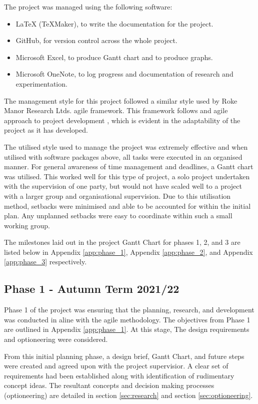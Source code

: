 \documentclass [11pt]{article}
\begin{document}
The project was managed using the following software: 

\begin{itemize}

\item{LaTeX (TeXMaker), to write the documentation for the project.}
\item{GitHub, for version control across the whole project.}
\item{Microsoft Excel, to produce Gantt chart and to produce graphs.}
\item{Microsoft OneNote, to log progress and documentation of research and experimentation.}

\end{itemize}

The management style for this project followed a similar style used by Roke Manor Research Ltds. agile framework. This framework follows and agile approach to project development \cite{agile_development}, which is evident in the adaptability of the project as it has developed. 

The utilised style used to manage the project was extremely effective and when utilised with software packages above, all tasks were executed in an organised manner. For general awareness of time management and deadlines, a Gantt chart was utilised. This worked well for this type of project, a solo project undertaken with the supervision of one party, but would not have scaled well to a project with a larger group and organisational supervision. Due to this utilisation method, setbacks were minimised and able to be accounted for within the initial plan. Any unplanned setbacks were easy to coordinate within such a small working group. 

The milestones laid out in the project Gantt Chart for phases 1, 2, and 3 are listed below in Appendix \ref{app:phase_1}, Appendix \ref{app:phase_2}, and Appendix \ref{app:phase_3} respectively.

\subsection{Phase 1 - Autumn Term 2021/22}

Phase 1 of the project was ensuring that the planning, research, and development was conducted in aline with the agile methodology. The objectives from Phase 1 are outlined in Appendix \ref{app:phase_1}. At this stage, The design requirements and optioneering were considered.  

From this initial planning phase, a design brief, Gantt Chart, and future steps were created and agreed upon with the project supervisior. A clear set of requirements had been established along with identification of rudimentary concept ideas. The resultant concepts and decision making processes (optioneering) are detailed in section \ref{sec:research} and section \ref{sec:optioneering}.  
\end{document}
